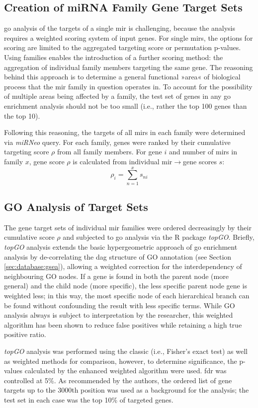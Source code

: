 \begin{method}

\subsection{Creation of miRNA Family Gene Target Sets}
\ac{go} analysis of the targets of a single \ac{mir} is challenging, because the analysis requires a weighted scoring system of input genes. For single \acp{mir}, the options for scoring are limited to the aggregated targeting score or permutation p-values. Using families enables the introduction of a further scoring method: the aggregation of individual family members targeting the same gene. The reasoning behind this approach is to determine a general functional »area« of biological process that the \ac{mir} family in question operates in. To account for the possibility of multiple areas being affected by a family, the test set of genes in any \ac{go} enrichment analysis should not be too small (i.e., rather the top 100 genes than the top 10). 

Following this reasoning, the targets of all \acp{mir} in each family were determined via \textit{miRNeo} query. For each family, genes were ranked by their cumulative targeting score $\rho$ from all family members. For gene $i$ and number of \acp{mir} in family $x$, gene score $\rho$ is calculated from individual \ac{mir}$\to$gene scores $s$: $$\rho_{i} = \sum_{n=1}^{x} s_{ni}$$

\subsection{GO Analysis of Target Sets} \label{sec:cellculture:topgo}
The gene target sets of individual \ac{mir} families were ordered decreasingly by their cumulative score $\rho$ and subjected to \ac{go} analysis via the R package \textit{topGO}.\cite{Alexa2006} Briefly, \textit{topGO} analysis extends the basic hypergeometric approach of \ac{go} enrichment analysis by de-correlating the \ac{dag} structure of GO annotation (see Section \ref{sec:database:gsea}), allowing a weighted correction for the interdependency of neighbouring GO nodes. If a gene is found in both the parent node (more general) and the child node (more specific), the less specific parent node gene is weighted less; in this way, the most specific node of each hierarchical branch can be found without confounding the result with less specific terms. While GO analysis always is subject to interpretation by the researcher, this weighted algorithm has been shown to reduce false positives while retaining a high true positive ratio.

\textit{topGO} analysis was performed using the classic (i.e., Fisher's exact test) as well as weighted methods for comparison, however, to determine significance, the p-values calculated by the enhanced weighted algorithm were used. \ac{fdr} was controlled at 5\%. As recommended by the authors,\cite{Alexa2006} the ordered list of gene targets up to the 3000th position was used as a background for the analysis; the test set in each case was the top 10\% of targeted genes.

\end{method}


